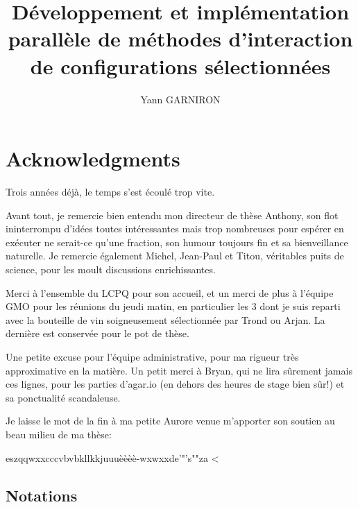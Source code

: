 \documentclass[12pt,a4paper]{report}
\title{Développement et implémentation parallèle de méthodes d'interaction de configurations sélectionnées}
\author{Yann GARNIRON}
\begin{document}
\dominitoc


\newpage

\chapter*{Acknowledgments}


Trois années déjà, le temps s'est écoulé trop vite.

Avant tout, je remercie bien entendu mon directeur de thèse Anthony, son flot ininterrompu d'idées toutes intéressantes mais trop nombreuses pour espérer en exécuter ne serait-ce qu'une fraction, son humour toujours fin et sa bienveillance naturelle. Je remercie également Michel, Jean-Paul et Titou, véritables puits de science, pour les moult discussions enrichissantes.

Merci à l'ensemble du LCPQ pour son accueil, et un merci de plus à l'équipe GMO pour les réunions du jeudi matin, en particulier les 3 dont je suis reparti avec la bouteille de vin soigneusement sélectionnée par Trond ou Arjan. La dernière est conservée pour le pot de thèse.

Une petite excuse pour l'équipe administrative, pour ma rigueur très approximative en la matière.
Un petit merci à Bryan, qui ne lira sûrement jamais ces lignes, pour les parties d'agar.io (en dehors des heures de stage bien sûr!) et sa ponctualité scandaleuse.

Je laisse le mot de la fin à ma petite Aurore venue m'apporter son soutien au beau milieu de ma thèse:

eszqqwxxcccvbvbkllkkjuuuèèèè-wxwxxde'"'s""za <


\newpage

\tableofcontents
\newpage

\section*{Notations}
\end{document}
